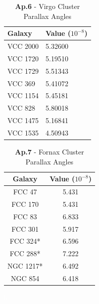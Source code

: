 \documentclass[12pt]{article}
\begin{document}
\FloatBarrier


\begin{table}[h!]
    \centering
\begin{tabular}{ll}

Galaxy  & Value (\(10^{-8}\)) \\
\hline
VCC 2000 & 5.32600 \\
VCC 1720 & 5.19510 \\
VCC 1729 & 5.51343 \\
VCC 369  & 5.41072 \\
VCC 1154 & 5.45181 \\
VCC 828  & 5.80018 \\
VCC 1475 & 5.16841 \\
VCC 1535 & 4.50943 \\
\hline
\end{tabular}
    \caption{\textbf{Ap.6} - Virgo Cluster Parallax Angles}
    \label{tab:my_label}
\end{table}
\FloatBarrier
\begin{table}[h!]
    \centering
    \begin{tabular}{c|c}
Galaxy  & Value (\(10^{-8}\)) \\
\hline
FCC 47   & 5.431 \\
FCC 170  & 5.431 \\
FCC 83   & 6.833\\
FCC 301  & 5.917 \\
FCC 324* & 6.596 \\
FCC 288* & 7.222 \\
NGC 1217*& 6.492 \\
NGC 854  & 6.418 \\
\hline
\end{tabular}
    \caption{\textbf{Ap.7} - Fornax Cluster Parallax Angles}
    \label{tab:my_label}
\end{table}

\newpage
\textcolor{white}{h}
\newpage
\newpage
\FloatBarrier


\end{document}
